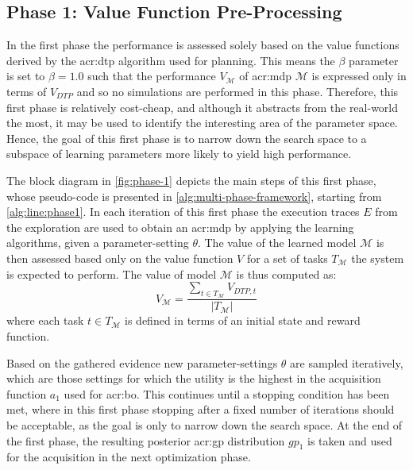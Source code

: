 \subsection{Phase 1: Value Function Pre-Processing}
\label{sec:phase-1}

In the first phase the performance is assessed solely based on the value functions derived by the \acrshort{acr:dtp} algorithm used for planning.
This means the $\beta$ parameter is set to $\beta = 1.0$ such that the performance $V_{\mathcal{M}}$ of \acrshort{acr:mdp} $\mathcal{M}$ is expressed only in terms of $V_\mathit{DTP}$ and so no simulations are performed in this phase.
Therefore, this first phase is relatively cost-cheap, and although it abstracts from the real-world the most, it may be used to identify the interesting area of the parameter space.
Hence, the goal of this first phase is to narrow down the search space to a subspace of learning parameters more likely to yield high performance.

The block diagram in \autoref{fig:phase-1} depicts the main steps of this first phase, whose pseudo-code is presented in \autoref{alg:multi-phase-framework}, starting from \autoref{alg:line:phase1}.
In each iteration of this first phase the execution traces $E$ from the exploration are used to obtain an \acrshort{acr:mdp} by applying the learning algorithms, given a parameter-setting $\theta$.
The value of the learned model $\mathcal{M}$ is then assessed based only on the value function $V$ for a set of tasks $T_\mathcal{M}$ the system is expected to perform.
The value of model $\mathcal{M}$ is thus computed as:
\begin{equation*} 
V_{\mathcal{M}} = \frac{\sum_{t \in T_\mathcal{M}} V_{\mathit{DTP}, t}}{|T_\mathcal{M}|}
\end{equation*}
where each task $t \in T_\mathcal{M}$ is defined in terms of an initial state and reward function.

Based on the gathered evidence new parameter-settings $\theta$ are sampled iteratively, which are those settings for which the utility is the highest in the acquisition function $a_1$ used for \acrshort{acr:bo}.
This continues until a stopping condition has been met, where in this first phase stopping after a fixed number of iterations should be acceptable, as the goal is only to narrow down the search space.
At the end of the first phase, the resulting posterior \acrshort{acr:gp} distribution $\mathit{gp}_1$ is taken and used for the acquisition in the next optimization phase.


